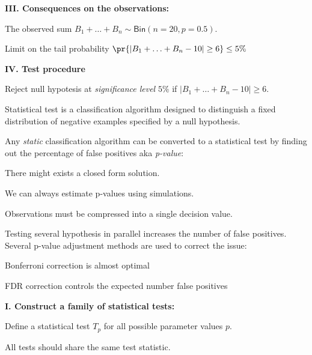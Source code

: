 \documentclass[landscape,footrule]{foils}
\begin{document}
\textbf{III. Consequences on the observations:} 
\begin{triangles}
\item The observed sum $B_1+\ldots+B_n\sim\mathsf{Bin}(n=20, p=0.5)$.
\item Limit on the tail probability $\pr{|B_1+\ldots+B_n-10|\geq 6}\leq 5\%$
\end{triangles}
\vspace*{1cm}

\textbf{IV. Test procedure}
\begin{triangles}
\item Reject null hypotesis at \emph{significance level} $5\%$ if $|B_1+\ldots+B_n-10|\geq 6$.  
\end{triangles}
 

Statistical test is a classification algorithm designed to distinguish a fixed distribution of negative examples specified by a null hypothesis.
\vspace*{2ex}

Any \emph{static} classification algorithm can be converted to a statistical test by finding out the percentage of false positives aka \emph{p-value}:
\begin{triangles}
\item There might exists a closed form solution.
\item We can always estimate p-values using simulations. 
\item Observations must be compressed into a single decision value.
\end{triangles}
\vspace*{2ex}

Testing several hypothesis in parallel increases the number of false positives.  
Several p-value adjustment methods are used to correct the issue:
\begin{triangles}
\item Bonferroni correction is almost optimal 
\item FDR correction controls the expected number false positives  
\end{triangles}  
 

 
\textbf{I. Construct a family of statistical tests:}
\begin{triangles}
\item Define a statistical test $T_p$ for all possible parameter values $p$.
\item All tests should share the same test statistic.
\end{triangles}
\vspace*{1cm}
\end{document}
